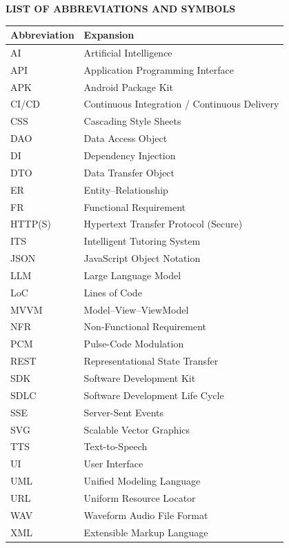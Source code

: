 \clearpage
\thispagestyle{plain}
\begin{center}
{\Large\bfseries LIST OF ABBREVIATIONS AND SYMBOLS\par}
\end{center}
\vspace{4mm}

\begin{center}
\begin{tabular}{@{}ll@{}}
\toprule
\textbf{Abbreviation} & \textbf{Expansion}\\
\midrule
AI    & Artificial Intelligence\\
API   & Application Programming Interface\\
APK   & Android Package Kit\\
CI/CD & Continuous Integration / Continuous Delivery\\
CSS   & Cascading Style Sheets\\
DAO   & Data Access Object\\
DI    & Dependency Injection\\
DTO   & Data Transfer Object\\
ER    & Entity--Relationship\\
FR    & Functional Requirement\\
HTTP(S) & Hypertext Transfer Protocol (Secure)\\
ITS   & Intelligent Tutoring System\\
JSON  & JavaScript Object Notation\\
LLM   & Large Language Model\\
LoC   & Lines of Code\\
MVVM  & Model--View--ViewModel\\
NFR   & Non-Functional Requirement\\
PCM   & Pulse-Code Modulation\\
REST  & Representational State Transfer\\
SDK   & Software Development Kit\\
SDLC  & Software Development Life Cycle\\
SSE   & Server-Sent Events\\
SVG   & Scalable Vector Graphics\\
TTS   & Text-to-Speech\\
UI    & User Interface\\
UML   & Unified Modeling Language\\
URL   & Uniform Resource Locator\\
WAV   & Waveform Audio File Format\\
XML   & Extensible Markup Language\\
\bottomrule
\end{tabular}
\end{center}


